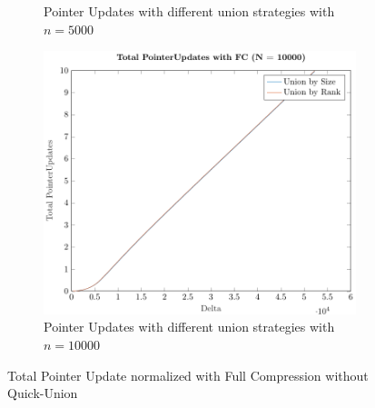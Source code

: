 \begin{figure}[ht]
\begin{subfigure}{0.32\textwidth}
        \caption{Pointer Updates with different union strategies with $n = 5000$}
    \end{subfigure}%
    \hfill
    \begin{subfigure}{0.32\textwidth}
        \centering
        \includegraphics[width=\textwidth]{../images/plotFCNonFull10000_PointerUpdates.pdf}
        \caption{Pointer Updates with different union strategies with $n = 10000$}
    \end{subfigure}

    \caption{Total Pointer Update normalized with Full Compression without Quick-Union}
    \label{fig:tpuFCNoQU}
\end{figure}
